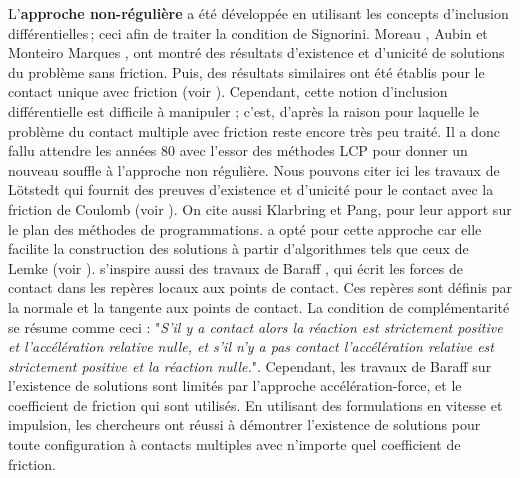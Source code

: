 L'\textbf{approche non-régulière} a été développée en utilisant les concepts d'inclusion différentielles ; ceci afin de traiter la condition de Signorini. Moreau \parencite{moreau1985standard}, Aubin \parencite{aubin2012differential} et Monteiro Marques \parencite{monteiro1985chocs}, ont montré des résultats d’existence et d’unicité de solutions du problème sans friction. Puis, des résultats similaires ont été établis pour le contact unique avec friction (voir \parencite{moreau1986dynamique,monteiro1988inclusoes,panagiotopoulos2012inequality,jean1985system,monteiro1994existence}). Cependant, cette notion d'inclusion différentielle est difficile à manipuler ; c'est, d'après \citeauthor{rabatel2015thesis} la raison pour laquelle le problème du contact multiple avec friction reste encore très peu traité. Il a donc fallu attendre les années 80 avec l'essor des méthodes LCP pour donner un nouveau souffle à l'approche non régulière. Nous pouvons citer ici les travaux de Lötstedt qui fournit des preuves d’existence et d’unicité pour le contact avec la friction de Coulomb (voir \parencite{lotstedt1981coulomb,lotstedt1982mechanical,lotstedt1982time}). On cite aussi Klarbring et Pang, pour leur apport sur le plan des méthodes de programmations. \citeauthor{rabatel2015thesis} a opté pour cette approche car elle facilite la construction des solutions à partir d’algorithmes tels que ceux de Lemke (voir \parencite{lemke1978some}). \citeauthor{rabatel2015thesis} s'inspire aussi des travaux de Baraff \parencite{baraff1993issues}, qui écrit les forces de contact dans les repères locaux aux points de contact. Ces repères sont définis par la normale et la tangente aux points de contact. La condition de complémentarité se résume comme ceci : "\textit{S’il y a contact alors la réaction est strictement positive et l’accélération relative nulle, et s’il n’y a pas contact l’accélération relative est strictement positive et la réaction nulle.}". Cependant, les travaux de Baraff sur l'existence de solutions sont limités par l'approche accélération-force, et le coefficient de friction qui sont utilisés. En utilisant des formulations en vitesse et impulsion, les chercheurs ont réussi à démontrer l’existence de solutions pour toute configuration à contacts multiples avec n’importe quel coefficient de friction.


